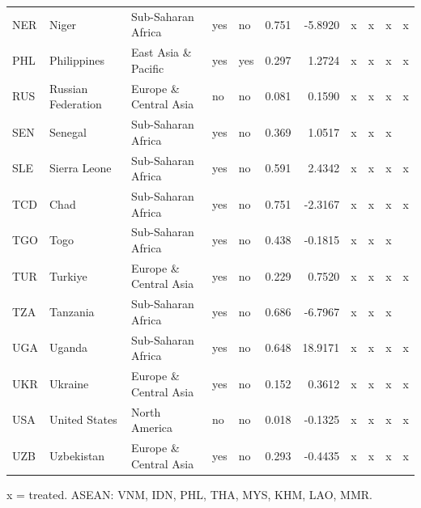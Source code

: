 \begin{table}[htbp]
\begin{tabular}{lllllrrcccc}
NER & Niger & Sub-Saharan Africa & yes & no & 0.751 & -5.8920 & x & x & x & x \\
PHL & Philippines & East Asia \& Pacific & yes & yes & 0.297 & 1.2724 & x & x & x & x \\
RUS & Russian Federation & Europe \& Central Asia & no & no & 0.081 & 0.1590 & x & x & x & x \\
SEN & Senegal & Sub-Saharan Africa & yes & no & 0.369 & 1.0517 & x & x & x &  \\
SLE & Sierra Leone & Sub-Saharan Africa & yes & no & 0.591 & 2.4342 & x & x & x & x \\
TCD & Chad & Sub-Saharan Africa & yes & no & 0.751 & -2.3167 & x & x & x & x \\
TGO & Togo & Sub-Saharan Africa & yes & no & 0.438 & -0.1815 & x & x & x &  \\
TUR & Turkiye & Europe \& Central Asia & yes & no & 0.229 & 0.7520 & x & x & x & x \\
TZA & Tanzania & Sub-Saharan Africa & yes & no & 0.686 & -6.7967 & x & x & x &  \\
UGA & Uganda & Sub-Saharan Africa & yes & no & 0.648 & 18.9171 & x & x & x & x \\
UKR & Ukraine & Europe \& Central Asia & yes & no & 0.152 & 0.3612 & x & x & x & x \\
USA & United States & North America & no & no & 0.018 & -0.1325 & x & x & x & x \\
UZB & Uzbekistan & Europe \& Central Asia & yes & no & 0.293 & -0.4435 & x & x & x & x \\
\bottomrule
\end{tabular}
\par\smallskip\footnotesize x = treated. ASEAN: VNM, IDN, PHL, THA, MYS, KHM, LAO, MMR.
\end{table}
